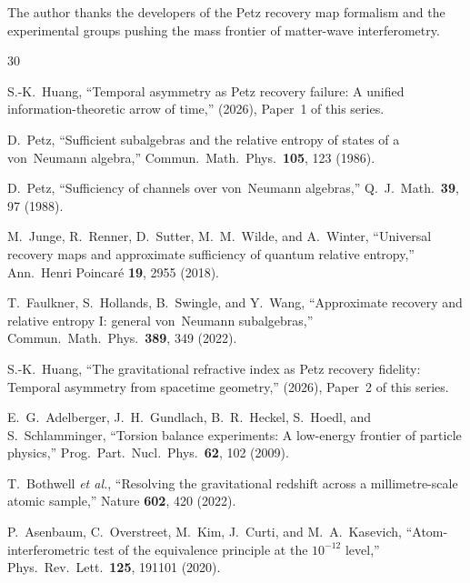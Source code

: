 \documentclass[prd,twocolumn,superscriptaddress,longbibliography,floatfix]{revtex4-2}
\begin{document}
\begin{acknowledgments}
The author thanks the developers of the Petz recovery map formalism
and the experimental groups pushing the mass frontier of matter-wave
interferometry.
\end{acknowledgments}

\begin{thebibliography}{30}

S.-K.~Huang,
``Temporal asymmetry as Petz recovery failure: A unified
information-theoretic arrow of time,''
(2026), Paper~1 of this series.

D.~Petz,
``Sufficient subalgebras and the relative entropy of states of a
von~Neumann algebra,''
Commun.\ Math.\ Phys.\ \textbf{105}, 123 (1986).

D.~Petz,
``Sufficiency of channels over von~Neumann algebras,''
Q.\ J.\ Math.\ \textbf{39}, 97 (1988).

M.~Junge, R.~Renner, D.~Sutter, M.~M.~Wilde, and A.~Winter,
``Universal recovery maps and approximate sufficiency of quantum
relative entropy,''
Ann.\ Henri Poincar\'e \textbf{19}, 2955 (2018).

T.~Faulkner, S.~Hollands, B.~Swingle, and Y.~Wang,
``Approximate recovery and relative entropy I: general von~Neumann
subalgebras,''
Commun.\ Math.\ Phys.\ \textbf{389}, 349 (2022).

S.-K.~Huang,
``The gravitational refractive index as Petz recovery fidelity:
Temporal asymmetry from spacetime geometry,''
(2026), Paper~2 of this series.

E.~G.~Adelberger, J.~H.~Gundlach, B.~R.~Heckel, S.~Hoedl, and
S.~Schlamminger,
``Torsion balance experiments: A low-energy frontier of particle
physics,''
Prog.\ Part.\ Nucl.\ Phys.\ \textbf{62}, 102 (2009).

T.~Bothwell \textit{et al.},
``Resolving the gravitational redshift across a millimetre-scale
atomic sample,''
Nature \textbf{602}, 420 (2022).

P.~Asenbaum, C.~Overstreet, M.~Kim, J.~Curti, and M.~A.~Kasevich,
``Atom-interferometric test of the equivalence principle at the
$10^{-12}$ level,''
Phys.\ Rev.\ Lett.\ \textbf{125}, 191101 (2020).


\end{thebibliography}
\end{document}
